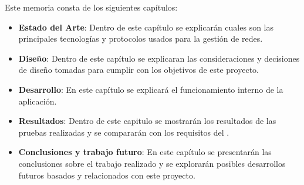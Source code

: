 Este memoria consta de los siguientes capítulos:
\begin{itemize}
    \item\textbf{Estado del Arte}: Dentro de este capítulo se explicarán cuales son las principales tecnologías y protocolos usados para la gestión de redes.
    \item\textbf{Diseño}: Dentro de este capítulo se explicaran las consideraciones y decisiones de diseño tomadas para cumplir con los objetivos de este proyecto.
    \item\textbf{Desarrollo}: En este capítulo se explicará el funcionamiento interno de la aplicación.
    \item\textbf{Resultados}: Dentro de este capitulo se mostrarán los resultados de las pruebas realizadas y se compararán con los requisitos del \cite{RFC8641}.
    \item\textbf{Conclusiones y trabajo futuro}: En este capítulo se presentarán las conclusiones sobre el trabajo realizado y se explorarán posibles desarrollos futuros basados y relacionados con este proyecto. 
\end{itemize}
